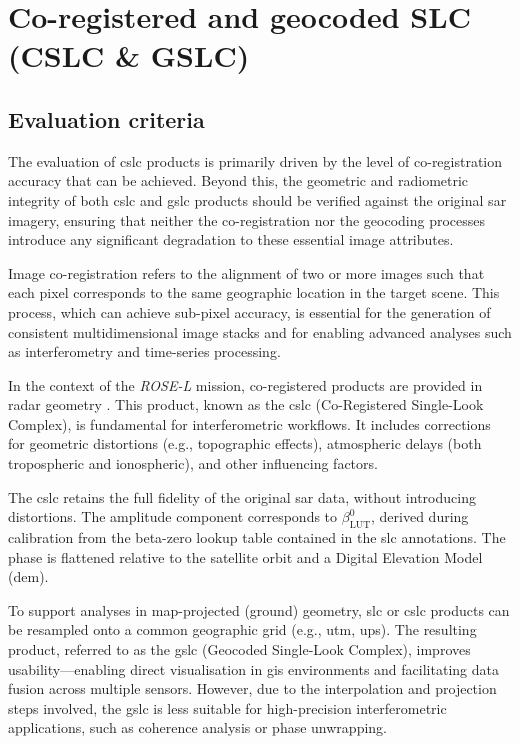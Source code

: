 \section{Co-registered and geocoded SLC (CSLC \& GSLC)}
\label{sec:cslc_gslc}

\subsection{Evaluation criteria}
\label{sec:cslc_criteria}

The evaluation of \acs{cslc} products is primarily driven by the level of co-registration accuracy that can be achieved. Beyond this, the geometric and radiometric integrity of both \acs{cslc} and \acs{gslc} products should be verified against the original \acs{sar} imagery, ensuring that neither the co-registration nor the geocoding processes introduce any significant degradation to these essential image attributes.

Image co-registration refers to the alignment of two or more images such that each pixel corresponds to the same geographic location in the target scene. This process, which can achieve sub-pixel accuracy, is essential for the generation of consistent multidimensional image stacks and for enabling advanced analyses such as interferometry and time-series processing.

In the context of the \textit{ROSE-L} mission, co-registered products are provided in radar geometry \cite{RD41}. This product, known as the \acs{cslc} (Co-Registered Single-Look Complex), is fundamental for interferometric workflows. It includes corrections for geometric distortions (e.g., topographic effects), atmospheric delays (both tropospheric and ionospheric), and other influencing factors.

The \acs{cslc} retains the full fidelity of the original \acs{sar} data, without introducing distortions. The amplitude component corresponds to $\beta_{\mathrm{LUT}}^0$, derived during calibration from the beta-zero lookup table contained in the \acs{slc} annotations. The phase is flattened relative to the satellite orbit and a Digital Elevation Model (\acs{dem}).

To support analyses in map-projected (ground) geometry, \acs{slc} or \acs{cslc} products can be resampled onto a common geographic grid (e.g., \acs{utm}, \acs{ups}). The resulting product, referred to as the \acs{gslc} (Geocoded Single-Look Complex), improves usability—enabling direct visualisation in \acs{gis} environments and facilitating data fusion across multiple sensors. However, due to the interpolation and projection steps involved, the \acs{gslc} is less suitable for high-precision interferometric applications, such as coherence analysis or phase unwrapping.

